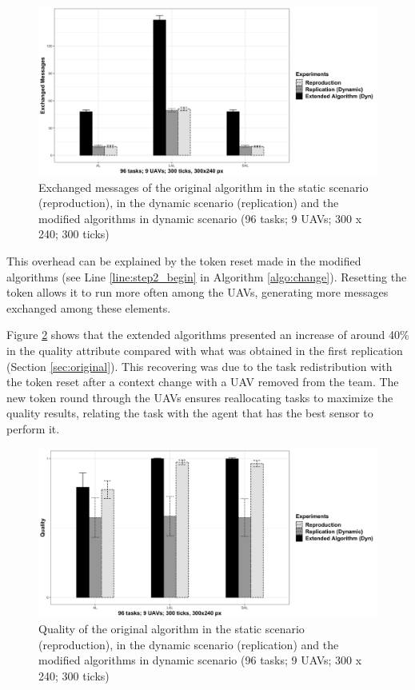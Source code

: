 \begin{figure}[h!]
	\begin{center}
		\includegraphics[scale=0.15]{fig/GRAPH06.png}
		\caption{Exchanged messages  of the original algorithm in the static scenario (reproduction), in the dynamic scenario (replication) and the modified algorithms in dynamic scenario (96 tasks; 9 UAVs; 300 x 240; 300 ticks)}
		\label{fig:fig06}
	\end{center}
\end{figure}

This overhead can be explained by the token reset made in the modified algorithms (see Line \ref{line:step2_begin} in Algorithm \ref{algo:change}). Resetting the token allows it to run more often among the UAVs, generating more messages exchanged among these elements.

Figure \ref{fig:fig05} shows that the extended algorithms presented an increase of around 40\% in the quality attribute compared with what was obtained in the first replication (Section \ref{sec:original}). This recovering was due to the task redistribution with the token reset after a context change with a UAV removed from the team. The new token round through the UAVs ensures reallocating tasks to maximize the quality results, relating the task with the agent that has the best sensor to perform it.

\begin{figure}[h!]
	\begin{center}
		\includegraphics[scale=0.15]{fig/GRAPH07.png}
		\caption{Quality of the original algorithm in the static scenario (reproduction), in the dynamic scenario (replication) and the modified algorithms in dynamic scenario (96 tasks; 9 UAVs; 300 x 240; 300 ticks)}
		\label{fig:fig05}
	\end{center}
\end{figure}

